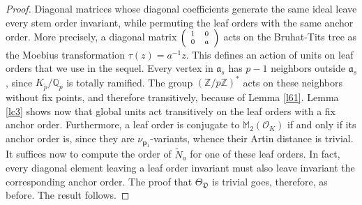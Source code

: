 \documentclass{article}
\theoremstyle{definition}
\theoremstyle{remark}
\newcommand\sbmattrix[4]{\textnormal{\scriptsize$\left(\begin{array}{cc}#1&#2\\#3&#4\end{array}\right)$\normalsize}}
\begin{document}
\begin{proof}
    Diagonal matrices whose diagonal coefficients generate the same
    ideal leave every stem order invariant,  while permuting the
    leaf orders with the same anchor order. More precisely, a diagonal 
    matrix $\sbmattrix 100a$ acts on the Bruhat-Tits tree as the Moebius 
    transformation $\tau(z)=a^{-1}z$. This defines an action of
    units on leaf orders that we use in the sequel. Every
    vertex in $\mathfrak{a}_s$ has $p-1$ neighbors outside 
    $\mathfrak{a}_s$, since $K_{\tilde{p}}/\mathbb{Q}_p$ is totally
    ramified. The group $(\mathbb{Z}/p\mathbb{Z})^*$ acts on
    these neighbors without fix points, and therefore transitively,
    because of Lemma \ref{l61}.  Lemma \ref{lc3} shows now
    that global units act transitively on the leaf orders
    with a fix anchor order. Furthermore, a leaf order
    is conjugate to $\mathbb{M}_2(\mathcal{O}_K)$ if and
    only if its anchor order is, since they are $\nu_{\mathbf{p}_1}$-variants, whence their
    Artin distance is trivial. It suffices now to 
    compute the order of $\tilde{N}_a$ for one of these 
    leaf orders. In fact, every diagonal element leaving a
    leaf order invariant must also leave invariant the 
    corresponding anchor order. The proof that 
    $\Theta_{\mathfrak{D}}$ is trivial goes, therefore, as before.
    The result follows.   
\end{proof}
\end{document}
